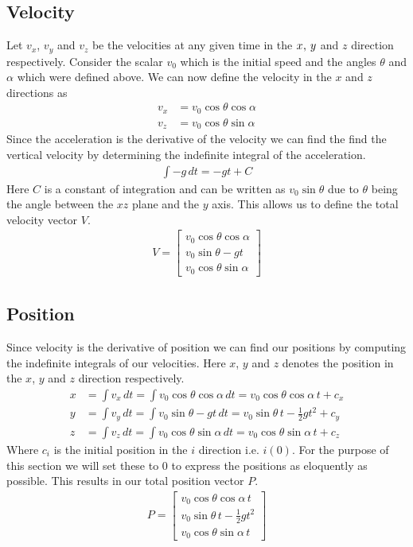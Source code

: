 \documentclass[%
aip,
jmp,
amsmath,amssymb,
reprint,%
]{revtex4-1}
\newcommand{\comma}{\hspace{0.1mm},\hspace{0.7mm}}
\begin{document}
	\subsection{Velocity}
	Let $v_x$, $v_y$ and $v_z$ be the velocities at any given time in the $x \comma y$ and $z$ direction respectively. Consider the scalar $v_0$ which is the initial speed and the angles $\theta$ and $\alpha$ which were defined above. We can now define the velocity in the $x$ and $z$ directions as
	\begin{align}\nonumber
		v_x &= v_0 \cos\theta\cos\alpha\\\nonumber
		v_z &= v_0 \cos\theta\sin\alpha
	\end{align}
	Since the acceleration is the derivative of the velocity we can find the find the vertical velocity by determining the indefinite integral of the acceleration.
	\begin{align}\nonumber
		\int-g\,dt = -gt + C
	\end{align}
	Here $C$ is a constant of integration and can be written as $v_0 \sin\theta$ due to $\theta$ being the angle between the $xz$ plane and the $y$ axis. This allows us to define the total velocity vector $V$.
	\begin{align}\nonumber
		V=
		\begin{bmatrix} 
			v_0 \cos\theta\cos\alpha \\
			v_0 \sin\theta - gt \\ 
			v_0 \cos\theta\sin\alpha
		\end{bmatrix}
	\end{align}
	\subsection{Position}
	Since velocity is the derivative of position we can find our positions by computing the indefinite integrals of our velocities. Here $x$, $y$ and $z$ denotes the position in the $x$, $y$ and $z$ direction respectively.
	\begin{align}\nonumber
		x&=\int v_x\,dt = \int v_0 \cos\theta\cos\alpha\,dt = v_0\cos\theta\cos\alpha\,t + c_x\\\nonumber
		y&=\int v_y\,dt = \int v_0 \sin\theta - gt\,dt = v_0\sin\theta\,t - \frac12gt^2 + c_y\\\nonumber
		z&=\int v_z\,dt = \int v_0 \cos\theta\sin\alpha\,dt = v_0\cos\theta\sin\alpha\,t + c_z\nonumber
	\end{align}
	Where $c_i$ is the initial position in the $i$ direction i.e. $i(0)$. For the purpose of this section we will set these to 0 to express the positions as eloquently as possible. This results in our total position vector $P$.
	\begin{align} \label{eq:posVec}
		P=
		\begin{bmatrix} 
			v_0 \cos\theta\cos\alpha\,t \\
			v_0 \sin\theta\,t - \frac12gt^2 \\ 
			v_0 \cos\theta\sin\alpha\,t
		\end{bmatrix}
	\end{align}
\end{document}
